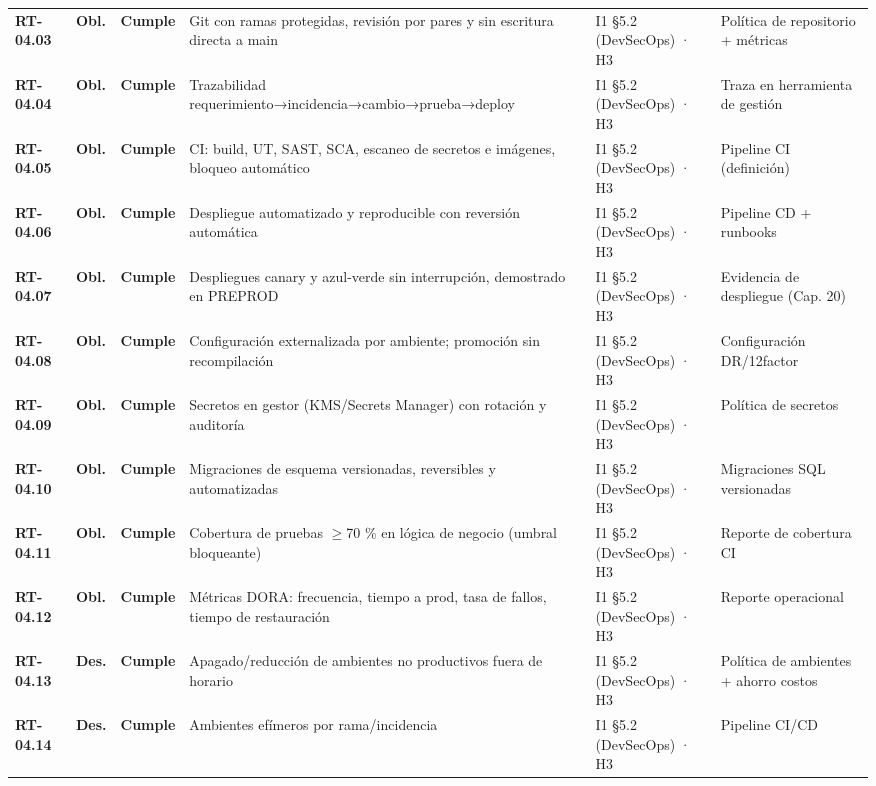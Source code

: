 \begin{small}
\begin{longtable}{@{}p{1.35cm} p{1.15cm} p{1.15cm} p{4.6cm} p{2.35cm} p{3.8cm}@{}}
\textbf{RT-04.03} & \textbf{Obl.} & \textbf{Cumple} & Git con ramas protegidas, revisi\'on por pares y sin escritura directa a main & I1 §5.2 (DevSecOps) · H3 & Pol\'itica de repositorio + m\'etricas \\
\textbf{RT-04.04} & \textbf{Obl.} & \textbf{Cumple} & Trazabilidad requerimiento→incidencia→cambio→prueba→deploy & I1 §5.2 (DevSecOps) · H3 & Traza en herramienta de gesti\'on \\
\textbf{RT-04.05} & \textbf{Obl.} & \textbf{Cumple} & CI: build, UT, SAST, SCA, escaneo de secretos e im\'agenes, bloqueo autom\'atico & I1 §5.2 (DevSecOps) · H3 & Pipeline CI (definici\'on) \\
\textbf{RT-04.06} & \textbf{Obl.} & \textbf{Cumple} & Despliegue automatizado y reproducible con reversi\'on autom\'atica & I1 §5.2 (DevSecOps) · H3 & Pipeline CD + runbooks \\
\textbf{RT-04.07} & \textbf{Obl.} & \textbf{Cumple} & Despliegues canary y azul-verde sin interrupci\'on, demostrado en PREPROD & I1 §5.2 (DevSecOps) · H3 & Evidencia de despliegue (Cap. 20) \\
\textbf{RT-04.08} & \textbf{Obl.} & \textbf{Cumple} & Configuraci\'on externalizada por ambiente; promoci\'on sin recompilaci\'on & I1 §5.2 (DevSecOps) · H3 & Configuraci\'on DR/12factor \\
\textbf{RT-04.09} & \textbf{Obl.} & \textbf{Cumple} & Secretos en gestor (KMS/Secrets Manager) con rotaci\'on y auditor\'ia & I1 §5.2 (DevSecOps) · H3 & Pol\'itica de secretos \\
\textbf{RT-04.10} & \textbf{Obl.} & \textbf{Cumple} & Migraciones de esquema versionadas, reversibles y automatizadas & I1 §5.2 (DevSecOps) · H3 & Migraciones SQL versionadas \\
\textbf{RT-04.11} & \textbf{Obl.} & \textbf{Cumple} & Cobertura de pruebas $\geq$70 \% en l\'ogica de negocio (umbral bloqueante) & I1 §5.2 (DevSecOps) · H3 & Reporte de cobertura CI \\
\textbf{RT-04.12} & \textbf{Obl.} & \textbf{Cumple} & M\'etricas DORA: frecuencia, tiempo a prod, tasa de fallos, tiempo de restauraci\'on & I1 §5.2 (DevSecOps) · H3 & Reporte operacional \\
\textbf{RT-04.13} & \textbf{Des.} & \textbf{Cumple} & Apagado/reducci\'on de ambientes no productivos fuera de horario & I1 §5.2 (DevSecOps) · H3 & Pol\'itica de ambientes + ahorro costos \\
\textbf{RT-04.14} & \textbf{Des.} & \textbf{Cumple} & Ambientes ef\'imeros por rama/incidencia & I1 §5.2 (DevSecOps) · H3 & Pipeline CI/CD \\

\end{longtable}
\end{small}
